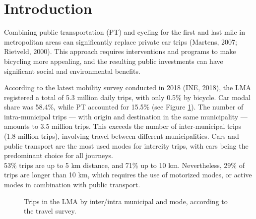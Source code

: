 \documentclass[review, doubleblind, 3p,
authoryear]{elsarticle} %
\begin{document}
\hypertarget{introduction}{%
\section{Introduction}\label{introduction}}

Combining public transportation (PT) and cycling for the first and last
mile in metropolitan areas can significantly replace private car trips
(Martens, 2007; Rietveld, 2000). This approach requires interventions
and programs to make bicycling more appealing, and the resulting public
investments can have significant social and environmental benefits.

According to the latest mobility survey conducted in 2018 (INE, 2018),
the LMA registered a total of 5.3 million daily trips, with only 0.5\%
by bicycle. Car modal share was 58.4\%, while PT accounted for 15.5\%
(see Figure \ref{fig:mododist}). The number of intra-municipal trips ---
with origin and destination in the same municipality --- amounts to 3.5
million trips. This exceeds the number of inter-municipal trips (1.8
million trips), involving travel between different municipalities. Cars
and public transport are the most used modes for intercity trips, with
cars being the predominant choice for all journeys.\\
53\% trips are up to 5 km distance, and 71\% up to 10 km. Nevertheless,
29\% of trips are longer than 10 km, which requires the use of motorized
modes, or active modes in combination with public transport.

\begin{figure}
\caption{\label{mododist}Trips in the LMA by inter/intra municipal and mode, according to the travel survey.}\label{fig:mododist}
\end{figure}
\end{document}

